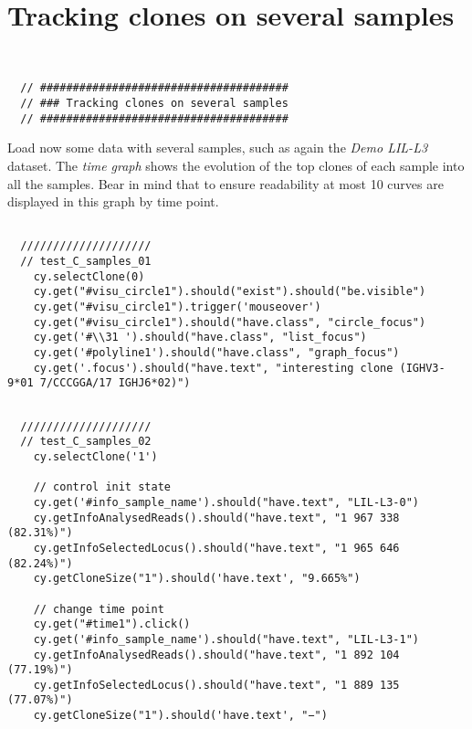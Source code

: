 

\section{Tracking clones on several samples}

\label{sec:tracking}
\begin{verbatim}


  // ######################################
  // ### Tracking clones on several samples
  // ######################################

\end{verbatim}

Load now some data with several samples, such as again the \textit{Demo LIL-L3} dataset.
The \textit{time graph} shows the evolution of the top clones of each sample into all the samples.
Bear in mind that to ensure readability at most 10 curves are displayed in this graph by time point.

\begin{verbatim}

  ////////////////////
  // test_C_samples_01
    cy.selectClone(0)
    cy.get("#visu_circle1").should("exist").should("be.visible")
    cy.get("#visu_circle1").trigger('mouseover')
    cy.get("#visu_circle1").should("have.class", "circle_focus")
    cy.get('#\\31 ').should("have.class", "list_focus")
    cy.get('#polyline1').should("have.class", "graph_focus")
    cy.get('.focus').should("have.text", "interesting clone (IGHV3-9*01 7/CCCGGA/17 IGHJ6*02)")


\end{verbatim}

\begin{verbatim}
  ////////////////////
  // test_C_samples_02
    cy.selectClone('1')

    // control init state
    cy.get('#info_sample_name').should("have.text", "LIL-L3-0")
    cy.getInfoAnalysedReads().should("have.text", "1 967 338 (82.31%)")
    cy.getInfoSelectedLocus().should("have.text", "1 965 646 (82.24%)")
    cy.getCloneSize("1").should('have.text', "9.665%")

    // change time point
    cy.get("#time1").click()
    cy.get('#info_sample_name').should("have.text", "LIL-L3-1")
    cy.getInfoAnalysedReads().should("have.text", "1 892 104 (77.19%)")
    cy.getInfoSelectedLocus().should("have.text", "1 889 135 (77.07%)")
    cy.getCloneSize("1").should('have.text', "−")


\end{verbatim}

